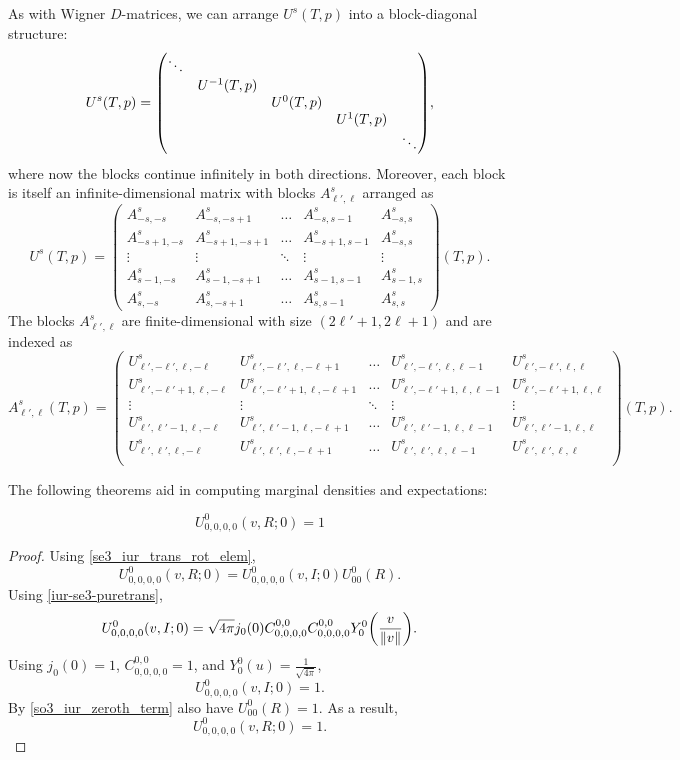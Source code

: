 \documentclass[../../main.tex]{subfiles}
\begin{document}
\begin{refsection}
	As with Wigner $D$-matrices, we can arrange $U^s(T, p)$ into a block-diagonal structure:
	$$U^s(T, p) = \mqty(\dmat{\ddots, {U^{-1}(T, p)}, {U^{0}(T, p)}, {U^{1}(T, p)},  \ddots}),$$
	where now the blocks continue infinitely in both directions.
	Moreover, each block is itself an infinite-dimensional matrix with blocks $A^s_{\ell',\ell}$ arranged as
	$$U^s(T, p) = \begin{pmatrix}
			A^s_{-s,-s}   & A^s_{-s, -s+1}   & \hdots & A^s_{-s, s-1}   & A^s_{-s, s} \\
			A^s_{-s+1,-s} & A^s_{-s+1, -s+1} & \hdots & A^s_{-s+1, s-1} & A^s_{-s, s} \\
			\vdots        & \vdots           & \ddots & \vdots          & \vdots      \\
			A^s_{s-1,-s}  & A^s_{s-1,-s+1}   & \hdots & A^s_{s-1,s-1}   & A^s_{s-1,s} \\
			A^s_{s,-s}    & A^s_{s,-s+1}     & \hdots & A^s_{s,s-1}     & A^s_{s,s}
		\end{pmatrix}(T, p).$$
	The blocks $A^s_{\ell',\ell}$ are finite-dimensional with size $(2\ell'+1, 2\ell+1)$ and are indexed as
	$$A^s_{\ell',\ell}(T, p) = \begin{pmatrix}
			U^s_{\ell',-\ell',\ell,-\ell}   & U^s_{\ell',-\ell',\ell,-\ell+1}   & \hdots & U^s_{\ell',-\ell',\ell,\ell-1}   & U^s_{\ell',-\ell',\ell,\ell}   \\
			U^s_{\ell',-\ell'+1,\ell,-\ell} & U^s_{\ell',-\ell'+1,\ell,-\ell+1} & \hdots & U^s_{\ell',-\ell'+1,\ell,\ell-1} & U^s_{\ell',-\ell'+1,\ell,\ell} \\
			\vdots                          & \vdots                            & \ddots & \vdots                           & \vdots                         \\
			U^s_{\ell',\ell'-1,\ell,-\ell}  & U^s_{\ell',\ell'-1,\ell,-\ell+1}  & \hdots & U^s_{\ell',\ell'-1,\ell,\ell-1}  & U^s_{\ell',\ell'-1,\ell,\ell}  \\
			U^s_{\ell',\ell',\ell,-\ell}    & U^s_{\ell',\ell',\ell,-\ell+1}    & \hdots & U^s_{\ell',\ell',\ell,\ell-1}    & U^s_{\ell',\ell',\ell,\ell}    \\
		\end{pmatrix} (T, p).$$

	The following theorems aid in computing marginal densities and expectations:

	\begin{theorem} \label{se3_iur_zeroth_term}
		$$U^0_{0,0,0,0}(v, R; 0) = 1$$
	\end{theorem}
	\begin{proof}
		Using \cref{se3_iur_trans_rot_elem},
		$$U^0_{0,0,0,0}(v, R; 0) = U^0_{0,0,0,0}(v, I; 0) U^0_{00}(R).$$
		Using \cref{iur-se3-puretrans},
		\begin{equation*}
			U^0_{0,0,0,0}(v, I; 0) =
			\sqrt{4\pi} j_0(0) C^{0,0}_{0,0,0,0}
			C^{0,0}_{0,0,0,0} Y^{0}_0 \qty( \frac{v}{\norm{v}} ).
		\end{equation*}
		Using $j_0(0) = 1$, $C^{0,0}_{0,0,0,0} = 1$, and $Y^0_0(u) = \frac{1}{\sqrt{4\pi}}$,
		$$U^0_{0,0,0,0}(v, I; 0) = 1.$$
		By \cref{so3_iur_zeroth_term} also have $U^0_{00}(R) = 1$.
		As a result,
		$$U^0_{0,0,0,0}(v, R; 0) = 1.$$
	\end{proof}


\end{refsection}
\end{document}
